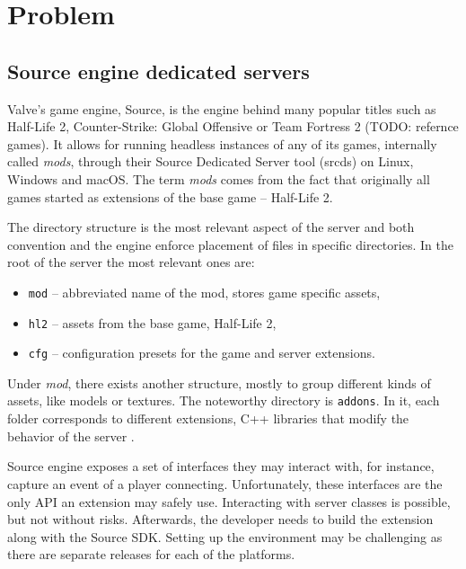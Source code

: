 \chapter{Problem}

\section{Source engine dedicated servers}

Valve's game engine, Source, is the engine behind many popular titles such as Half-Life 2, Counter-Strike: Global Offensive or Team Fortress 2 (TODO: refernce games).
It allows for running headless instances of any of its games, internally called \textit{mods}, through their Source Dedicated Server tool (srcds) on Linux, Windows and macOS\@.
The term \textit{mods} comes from the fact that originally all games started as extensions of the base game -- Half-Life 2.

The directory structure is the most relevant aspect of the server and both convention and the engine enforce placement of files in specific directories.
In the root of the server the most relevant ones are:

\begin{itemize}
    \item \verb|mod| -- abbreviated name of the mod, stores game specific assets,
    \item \verb|hl2| -- assets from the base game, Half-Life 2,
    \item \verb|cfg| -- configuration presets for the game and server extensions.
\end{itemize}

Under \textit{mod}, there exists another structure, mostly to group different kinds of assets, like models or textures.
The noteworthy directory is \verb|addons|.
In it, each folder corresponds to different extensions, C++ libraries that modify the behavior of the server \cite{server-plugins}.

Source engine exposes a set of interfaces they may interact with, for instance, capture an event of a player connecting.
Unfortunately, these interfaces are the only API an extension may safely use.
Interacting with server classes is possible, but not without risks.
Afterwards, the developer needs to build the extension along with the Source SDK\@.
Setting up the environment may be challenging as there are separate releases for each of the platforms.

